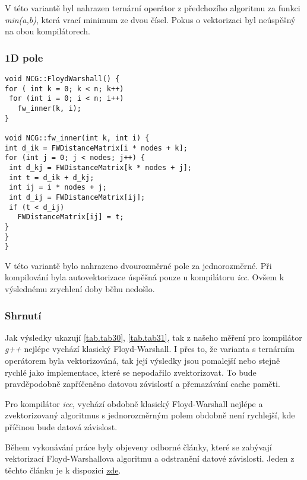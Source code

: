 \documentclass[a4paper,11pt]{article}
\begin{document}
V této variantě byl nahrazen ternární operátor z předchozího algoritmu za funkci \textit{min(a,b)}, která 
vrací minimum ze dvou čísel. Pokus o vektorizaci byl neúspěšný na obou kompilátorech.

\subsubsection{1D pole}
\lstset {language=C++}
\begin{lstlisting}
void NCG::FloydWarshall() {
for ( int k = 0; k < n; k++)
 for (int i = 0; i < n; i++)
   fw_inner(k, i);
}

void NCG::fw_inner(int k, int i) {
int d_ik = FWDistanceMatrix[i * nodes + k];
for (int j = 0; j < nodes; j++) {
 int d_kj = FWDistanceMatrix[k * nodes + j];
 int t = d_ik + d_kj;
 int ij = i * nodes + j;
 int d_ij = FWDistanceMatrix[ij];
 if (t < d_ij)
   FWDistanceMatrix[ij] = t;
}
}
}
\end{lstlisting}

V této variantě bylo nahrazeno dvourozměrné pole za jednorozměrné. Při kompilování byla autovektorizace
úspěšná pouze u kompilátoru \textit{icc}. Ovšem k výslednému zrychlení doby běhu nedošlo. 

\subsubsection{Shrnutí}
Jak výsledky ukazují \ref{tab.tab30}, \ref{tab.tab31}, tak z našeho měření pro kompilátor \textit{g++} nejlépe vychází klasický Floyd-Warshall. I přes to, že 
varianta s ternárním operátorem byla vektorizováná, tak její výsledky jsou pomalejší nebo stejně rychlé jako
implementace, které se nepodařilo zvektorizovat. To bude pravděpodobně zapříčeněno
datovou závislostí a přemazávání cache paměti.

Pro kompilátor \textit{icc}, vychází obdobně klasický Floyd-Warshall nejlépe a zvektorizovaný algoritmus s 
jednorozměrným polem obdobně
není rychlejší, kde příčinou bude datová závislost.

Během vykonávání práce byly objeveny odborné články, které se zabývají vektorizací Floyd-Warshallova algoritmu
a odstranění datové závislosti. Jeden z těchto článku je k dispozici \href{http://www.cs.virginia.edu/~pact2006/program/pact2006/pact139_han4.pdf}{zde}.
\end{document}
